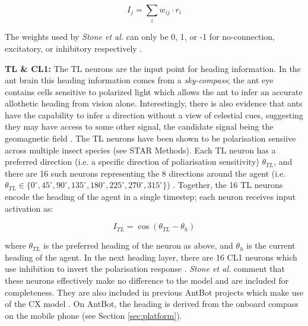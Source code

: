\documentclass[a4paper,11pt,twoside,openright]{article}
\begin{document}
\begin{equation}
  I_j = \sum_{i} w_{ij} \cdot r_i
\end{equation}

The weights used by \textit{Stone et al.} can only be 0, 1, or -1 for
no-connection, excitatory, or inhibitory respectively \cite{Stone2017}.
\newline
\par

\textbf{TL \& CL1:}
The TL neurons are the input point for heading information. In the ant brain
this heading information comes from a \textit{sky-compass}; the ant eye contains
cells sensitive to polarized light which allows the ant to infer an accurate
allothetic heading from vision alone. Interestingly, there is also evidence that ants
have the capability to infer a direction without a view of celestial cues,
suggesting they may have access to some other signal, the candidate signal being
the geomagnetic field \cite{Fleischmann2018, Grob2017}. The TL neurons have been
shown to be polarisation sensiive across multiple insect species \cite{Stone2017}
(see STAR Methods). Each TL neuron has a preferred direction (i.e. a specific
direction of poliarisation sensitivity) $\theta_{TL} $, and there are 16 such
neurons representing the 8 directions around the agent (i.e.
$\theta_{TL} \in \{ 0^{\circ}, 45^{\circ}, 90^{\circ}, 135^{\circ}, 180^{\circ},
225^{\circ}, 270^{\circ}, 315^{\circ}\} $) \cite{Stone2017}. Together, the 16
TL neurons encode the heading of the agent in a single timestep; each neuron
receives input activation as:

\begin{equation}
  I_{TL} = \cos ( \theta_{TL} - \theta_{h} )
\end{equation}

where $\theta_{TL} $ is the preferred heading of the neuron as above, and
$\theta_{h} $ is the current heading of the agent. In the next heading layer,
there are 16 CL1 neurons which use inhibition to invert the polarisation
response \cite{Stone2017}. \textit{Stone et al.} comment that these neurons
effectively make no difference to the model and are included for completeness.
They are also included in previous AntBot projects which make use of the CX model
\cite{Zhang2017, Scimeca2017}. On AntBot, the heading is derived from the onboard
compass on the mobile phone (see Section \ref{sec:platform}).
\newline
\par
\end{document}

